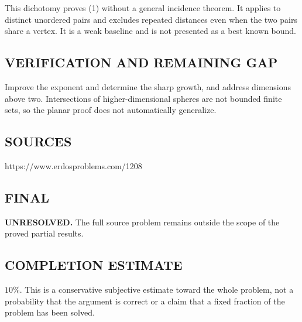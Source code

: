This dichotomy proves (1) without a general incidence theorem. It applies to
distinct unordered pairs and excludes repeated distances even when the two
pairs share a vertex. It is a weak baseline and is not presented as a best known bound.

\subsection*{VERIFICATION AND REMAINING GAP}
Improve the exponent and determine the sharp growth, and address dimensions
above two. Intersections of higher-dimensional spheres are not bounded finite
sets, so the planar proof does not automatically generalize.

\subsection*{SOURCES}
https://www.erdosproblems.com/1208

\subsection*{FINAL}
\textbf{UNRESOLVED.} The full source problem remains outside the scope of the proved partial results.

\subsection*{COMPLETION ESTIMATE}
$10\%$. This is a conservative subjective estimate toward the whole problem, not a probability that the argument is correct or a claim that a fixed fraction of the problem has been solved.
